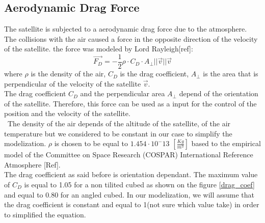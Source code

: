 \subsection{Aerodynamic Drag Force}
The satellite is subjected to a aerodynamic drag force due to the atmosphere. The collisions with the air caused a force in the opposite direction of the velocity of the satellite. the force was modeled by Lord Rayleigh[ref]:
\[
\vec{F_D} = -\frac{1}{2} \rho \cdot C_D \cdot A_{\perp} ||\vec{v}|| \vec{v}
\]
where $\rho$ is the density of the air, $C_D$ is the drag coefficient, $A_{\perp}$ is the area that is perpendicular of the velocity of the satellite $\vec{v}$. \\
The drag coefficient $C_D$ and the perpendicular area $A_{\perp}$ depend of the orientation of the satellite. Therefore, this force can be used as a input for the control of the position and the velocity of the satellite. \\\
The density of the air depends of the altitude of the satellite, of the air temperature but we considered to be constant in our case to simplify the modelization. $\rho$ is chosen to be equal to $1.454 \cdot 10^-13$ $[\frac{Kg}{m^3}]$ based to the  empirical model of the Committee on Space Research (COSPAR) International Reference Atmosphere [Ref]. \\ %
The drag coefficient as said before is orientation dependant. The maximum value of $C_D$ is equal to 1.05 for a non tilited cubed as shown on the figure \ref{drag_coef} and equal to 0.80 for an angled cubed. In our modelization, we will assume that the drag coefficient is constant and equal to 1(not sure which value take) in order to simplified the equation. \\
